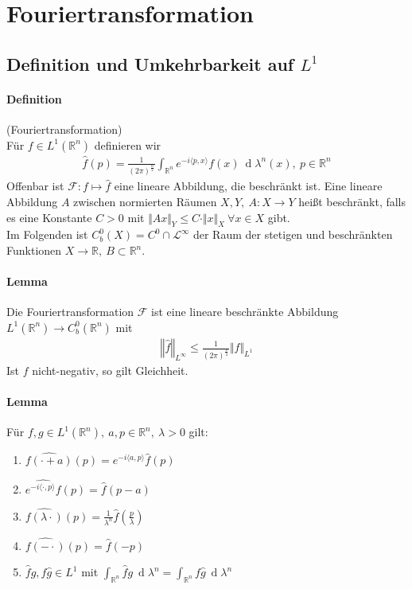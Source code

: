 \documentclass[12pt,a4paper,fleqn]{article}
\def\R{{\mathbb{R}}}
\def\d{{\operatorname{d}}}
\begin{document}
\section{Fouriertransformation}

\subsection{Definition und Umkehrbarkeit auf $L^1$}

\paragraph{Definition} (Fouriertransformation)\\
Für $f \in L^1(\R^n)$ definieren wir
\begin{align*}
\widehat{f}(p) = \frac{1}{(2\pi)^{\frac{n}{2}}} \int_{\mathbb{R}^n} e^{-i \langle p, x \rangle} f(x)\ \d\lambda^n(x),\ p \in \mathbb{R}^n
\end{align*}
Offenbar ist $\mathscr{F}\colon f \mapsto \widehat{f}$ eine lineare Abbildung, die beschränkt ist. Eine lineare Abbildung $A$ zwischen normierten Räumen $X, Y,\ A\colon X \rightarrow Y$ heißt beschränkt, falls es eine Konstante $C>0$ mit $\Vert Ax \Vert_Y \leq C \cdot \Vert x \Vert_X\ \forall x \in X$ gibt. \\
Im Folgenden ist $C^0_b(X) = C^0 \cap \mathscr{L}^\infty$ der Raum der stetigen und beschränkten Funktionen $X \rightarrow \mathbb{R},\ B\subset \mathbb{R}^n$.

\paragraph{Lemma} Die Fouriertransformation $\mathscr{F}$ ist eine lineare beschränkte Abbildung \linebreak\mbox{$L^1(\mathbb{R}^n) \rightarrow C_b^0(\mathbb{R}^n)$} mit
\begin{align*}
\left\Vert \widehat{f} \right\Vert_{L^\infty} \leq \frac{1}{(2\pi)^{\frac{n}{2}}} \Vert f \Vert_{L^1}
\end{align*}
Ist $f$ nicht-negativ, so gilt Gleichheit.

\paragraph{Lemma} Für $f, g \in L^1(\mathbb{R}^n),\ a, p \in \mathbb{R}^n,\ \lambda >0$ gilt:
\begin{enumerate}
\item$\widehat{f(\cdot + a)}(p) = e^{-i\langle a, p\rangle} \widehat{f}(p)$
\item$\widehat{e^{-i\langle \cdot, p\rangle} f}(p) = \widehat{f}(p-a)$
\item$\widehat{f(\lambda\cdot)}(p) = \frac{1}{\lambda^n} \widehat{f}(\frac{p}{\lambda})$
\item$\widehat{f(-\cdot)}(p) = \widehat{f}(-p)$
\item$\widehat{f}g, f\widehat{g} \in L^1$ mit $\int_{\mathbb{R}^n} \widehat{f}g\ \d\lambda^n = \int_{\mathbb{R}^n} f\widehat{g}\ \d\lambda^n$
\end{enumerate}
\end{document}
